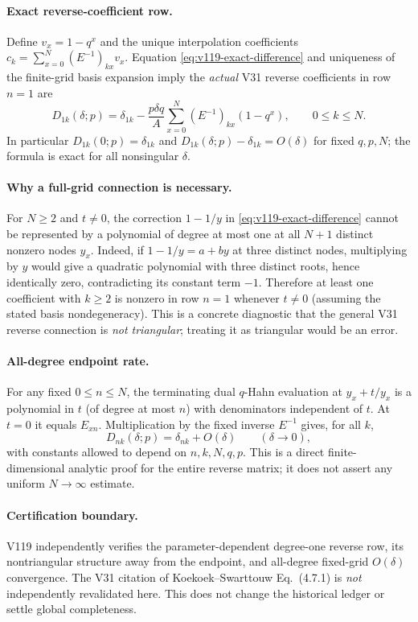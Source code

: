 \documentclass[11pt]{article}
\begin{document}
\paragraph{Exact reverse-coefficient row.} Define $v_x=1-q^x$ and the unique interpolation coefficients $c_k=\sum_{x=0}^{N}(E^{-1})_{kx}v_x$. Equation \eqref{eq:v119-exact-difference} and uniqueness of the finite-grid basis expansion imply the \emph{actual} V31 reverse coefficients in row $n=1$ are
\begin{equation}\label{eq:v119-D-row}
 \boxed{D_{1k}(\delta;p)=\delta_{1k}-\frac{p\delta q}{A}\sum_{x=0}^{N}(E^{-1})_{kx}(1-q^x),\qquad 0\le k\le N.}
\end{equation}
In particular $D_{1k}(0;p)=\delta_{1k}$ and $D_{1k}(\delta;p)-\delta_{1k}=O(\delta)$ for fixed $q,p,N$; the formula is exact for all nonsingular $\delta$.

\paragraph{Why a full-grid connection is necessary.} For $N\ge2$ and $t\ne0$, the correction $1-1/y$ in \eqref{eq:v119-exact-difference} cannot be represented by a polynomial of degree at most one at all $N+1$ distinct nonzero nodes $y_x$. Indeed, if $1-1/y=a+by$ at three distinct nodes, multiplying by $y$ would give a quadratic polynomial with three distinct roots, hence identically zero, contradicting its constant term $-1$. Therefore at least one coefficient with $k\ge2$ is nonzero in row $n=1$ whenever $t\ne0$ (assuming the stated basis nondegeneracy). This is a concrete diagnostic that the general V31 reverse connection is \emph{not triangular}; treating it as triangular would be an error.

\paragraph{All-degree endpoint rate.} For any fixed $0\le n\le N$, the terminating dual $q$-Hahn evaluation at $y_x+t/y_x$ is a polynomial in $t$ (of degree at most $n$) with denominators independent of $t$. At $t=0$ it equals $E_{xn}$. Multiplication by the fixed inverse $E^{-1}$ gives, for all $k$,
\[
 D_{nk}(\delta;p)=\delta_{nk}+O(\delta)\qquad(\delta\to0),
\]
with constants allowed to depend on $n,k,N,q,p$. This is a direct finite-dimensional analytic proof for the entire reverse matrix; it does not assert any uniform $N\to\infty$ estimate.

\paragraph{Certification boundary.} V119 independently verifies the parameter-dependent degree-one reverse row, its nontriangular structure away from the endpoint, and all-degree fixed-grid $O(\delta)$ convergence. The V31 citation of Koekoek--Swarttouw Eq.~(4.7.1) is \emph{not} independently revalidated here. This does not change the historical ledger or settle global completeness.
\end{document}
